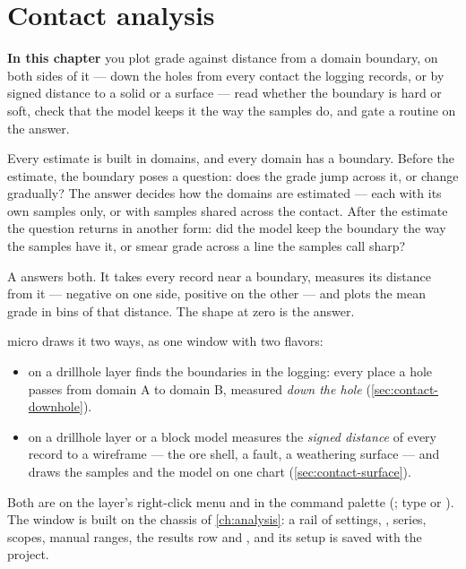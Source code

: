 \chapter{Contact analysis}\label{ch:contact}
\begin{goals}
\textbf{In this chapter} you plot grade against distance from a domain boundary, on both sides of it — down the holes from every contact the logging records, or by signed distance to a solid or a surface — read whether the boundary is hard or soft, check that the model keeps it the way the samples do, and gate a routine on the answer.
\end{goals}

Every estimate is built in domains, and every domain has a boundary. Before the estimate, the boundary poses a question: does the grade jump across it, or change gradually? The answer decides how the domains are estimated — each with its own samples only, or with samples shared across the contact. After the estimate the question returns in another form: did the model keep the boundary the way the samples have it, or smear grade across a line the samples call sharp?

A  answers both. It takes every record near a boundary, measures its distance from it — negative on one side, positive on the other — and plots the mean grade in bins of that distance. The shape at zero is the answer.

micro draws it two ways, as one window with two flavors:

\begin{itemize}
\item {} on a drillhole layer finds the boundaries in the logging: every place a hole passes from domain A to domain B, measured \emph{down the hole} (\cref{sec:contact-downhole}).
\item {} on a drillhole layer or a block model measures the \emph{signed distance} of every record to a wireframe — the ore shell, a fault, a weathering surface — and draws the samples and the model on one chart (\cref{sec:contact-surface}).
\end{itemize}

Both are on the layer's right-click menu and in the command palette (; type  or ). The window is built on the chassis of \cref{ch:analysis}: a rail of settings, , series, scopes, manual ranges, the results row and , and its setup is saved with the project.

